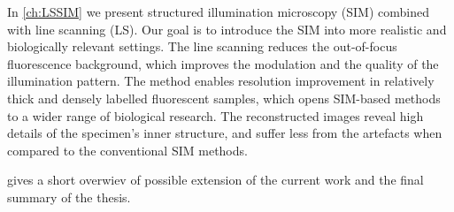 In \autoref{ch:LSSIM} we present structured illumination microscopy (SIM) combined with line scanning (LS). Our goal is to introduce the SIM into more realistic and biologically relevant settings. The line scanning reduces the out-of-focus fluorescence background, which improves the modulation and the quality of the illumination pattern. The method enables resolution improvement in relatively thick and densely labelled fluorescent samples, which opens SIM-based methods to a wider range of biological research. The reconstructed images reveal high details of the specimen's inner structure, and suffer less from the artefacts when compared to the conventional SIM methods.  

 gives a short overwiev of possible extension of the current work and the final summary of the thesis. 


